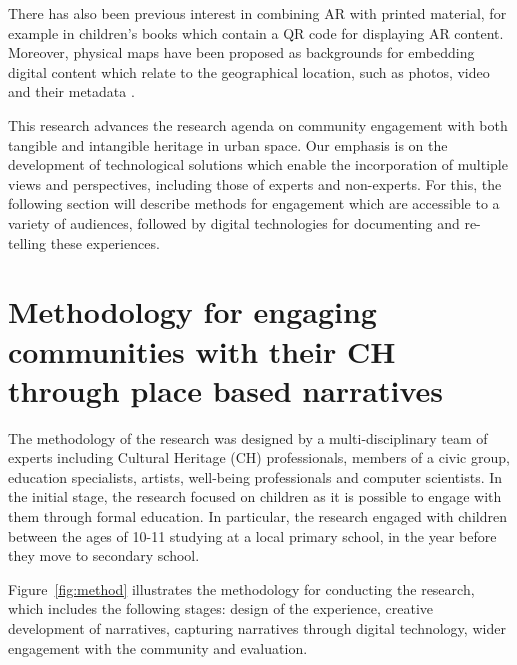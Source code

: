 \documentclass[acmlarge,screen,dvipsnames]{acmart}
\begin{document}
There has also been previous interest in combining AR with printed material,
for example in children's books which contain a QR code for displaying AR
content. Moreover, physical maps have been proposed as backgrounds for
embedding digital content which relate to the geographical location, such as
photos, video and their metadata \cite{Morrison:2009:LBA:1518701.1518991,
Terracciano:2017:MMR:3027063.3052958}.

This research advances the research agenda on community engagement with both
tangible and intangible heritage in urban space. Our emphasis is on the
development of technological solutions which enable the incorporation of multiple
views and perspectives, including those of experts and non-experts. For this,
the following section will  describe methods for engagement which are
accessible to a variety of audiences, followed by digital technologies for
documenting and re-telling these experiences. 


\section{Methodology for engaging communities with their CH through place
based narratives} 
\label{meth} The methodology of the research was designed by
a multi-disciplinary team of experts including Cultural Heritage (CH)
professionals, members of a civic group, education specialists, artists,
well-being professionals and computer scientists. In the initial stage, the
research focused on children as it is possible to engage with them through
formal education. In particular, the research engaged with children between
the ages of 10-11 studying at a local primary school, in the year before they
move to secondary school.

Figure~\ref{fig:method} illustrates the methodology for conducting the
research, which includes the following stages: design of the experience,
creative development of narratives, capturing narratives through digital
technology, wider engagement with the community and evaluation.
\end{document}
